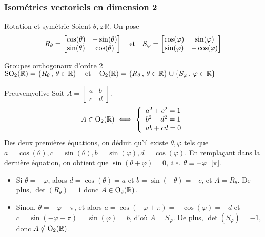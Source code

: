     \subsubsection{Isométries vectoriels en dimension 2}

    \begin{defi}{Rotation et symétrie}{}
        Soient $\theta, \varphi \mathbb{R}$. On pose 
        \[ R_{\theta} = \begin{bmatrix}
            \cos(\theta) & -\sin(\theta) \\
            \sin(\theta) & \cos(\theta)
        \end{bmatrix} \quad \text{et} \quad S_{\varphi} = \begin{bmatrix}
            \cos(\varphi) & \sin(\varphi) \\
            \sin(\varphi) & -\cos(\varphi)
        \end{bmatrix} \]   
    \end{defi}

    \begin{prop}{Groupes orthogonaux d’ordre $2$}{}
        $\operatorname{SO}_2(\mathbb{R}) = \left\{ R_{\theta} \, , \, \theta \in \mathbb{R} \right\} \quad \text{et} \quad \operatorname{O}_2(\mathbb{R}) = \left\{ R_{\theta} \, , \, \theta \in \mathbb{R} \right\} \cup \left\{ S_{\varphi} \, , \, \varphi \in \mathbb{R} \right\}$
    \end{prop}

    \begin{demo}{Preuve}{myolive}
        Soit $A = \begin{bmatrix}
            a & b \\
            c & d
        \end{bmatrix}$.
        \[ A \in \operatorname{O}_2(\mathbb{R}) \iff \left\{ \begin{array}{l}
            a^2 + c^2 = 1 \\
            b^2 + d^2 = 1 \\
            ab + cd = 0
        \end{array} \right. \] 
        Des deux premières équations, on déduit qu’il existe $\theta, \varphi$ tels que $a = \cos(\theta), c = \sin(\theta), b = \sin(\varphi), d = \cos(\varphi)$. En remplaçant dans la dernière équation, on obtient que $\sin(\theta + \varphi) = 0$, \textit{i.e.} $\eqmodulo{\theta}{-\varphi}{\pi}$.
        \begin{itemize}
            \item Si $\theta = -\varphi$, alors $d = \cos(\theta) = a$ et $b = \sin(-\theta) = -c$, et $A = R_{\theta}$. De plus, $\det(R_{\theta}) = 1$ donc $A \in \operatorname{O}_2(\mathbb{R})$.
            \item Sinon, $\theta = - \varphi + \pi$, et alors $a = \cos(-\varphi + \pi) = - \cos(\varphi) = -d$ et $c = \sin(-\varphi + \pi) = \sin(\varphi) = b$, d’où $A = S_{\varphi}$. De plus, $\det(S_{\varphi}) = -1$, donc $A \notin \operatorname{O}_2(\mathbb{R})$.
        \end{itemize}
    \end{demo}

